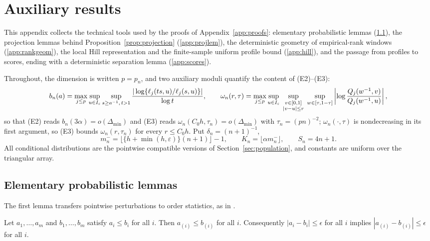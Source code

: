 \section{Auxiliary results}
\label{app:aux}
\renewcommand{\theequation}{A.\arabic{equation}}
\setcounter{equation}{0}

This appendix collects the technical tools used by the proofs of
Appendix~\ref{app:proofs}: elementary probabilistic lemmas
(\ref{app:elementary}), the projection lemmas behind
Proposition~\ref{prop:projection} (\ref{app:projlem}), the deterministic
geometry of empirical-rank windows (\ref{app:rankgeom}), the local Hill
representation and the finite-sample uniform profile bound
(\ref{app:hill}), and the passage from profiles to scores, ending with a
deterministic separation lemma (\ref{app:scores}).

Throughout, the dimension is written $p=p_n$, and two auxiliary moduli
quantify the content of (E2)--(E3):
\[
 b_n(a)=\max_{j\le p}\sup_{u\in I_\varepsilon}\sup_{s\ge a^{-1},\,t>1}
 \frac{|\log\{\ell_j(ts,u)/\ell_j(s,u)\}|}{\log t},
 \qquad
 \omega_n(r,\tau)=\max_{j\le p}
 \sup_{u\in I_\varepsilon}\;
 \sup_{\substack{v\in[0,1]\\|v-u|\le r}}\;
 \sup_{w\in[\tau,1-\tau]}
 \left|\log\frac{Q_j(w^{-1},v)}{Q_j(w^{-1},u)}\right|,
\]
so that (E2) reads $b_n(3\alpha)=o(\Delta_{\min})$ and (E3) reads
$\omega_n(C_0h,\tau_n)=o(\Delta_{\min})$ with $\tau_n=(pn)^{-2}$;
$\omega_n(\cdot,\tau)$ is nondecreasing in its first argument, so (E3)
bounds $\omega_n(r,\tau_n)$ for every $r\le C_0h$.  Put
$\delta_n=(n+1)^{-1}$,
\[
 m_n^-=\bigl\lfloor\{h+\min(h,\varepsilon)\}(n+1)\bigr\rfloor-1,
 \qquad
 K_n=\lfloor\alpha m_n^-\rfloor,
 \qquad
 S_n=4n+1.
\]
All conditional distributions are the pointwise compatible versions of
Section~\ref{sec:population}, and constants are uniform over the
triangular array.

\subsection{Elementary probabilistic lemmas}\label{app:elementary}

The first lemma transfers pointwise perturbations to order statistics, as
in \citet[Appendix, Lemma~3]{gardesPodgorny2025}.

\begin{lemma}\label{lem:app-sorting}
Let $a_1,\ldots,a_m$ and $b_1,\ldots,b_m$ satisfy $a_i\le b_i$ for all $i$.
Then $a_{(i)}\le b_{(i)}$ for all $i$.  Consequently
$|a_i-b_i|\le\epsilon$ for all $i$ implies
$|a_{(i)}-b_{(i)}|\le\epsilon$ for all $i$.
\end{lemma}

